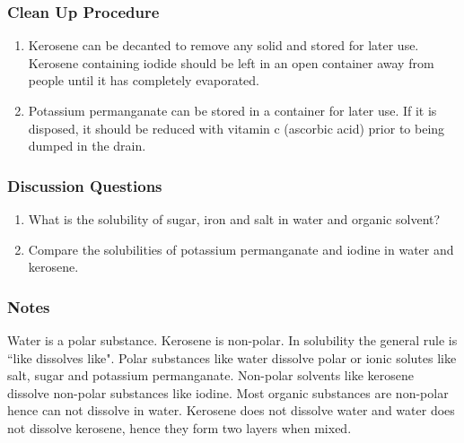 \subsubsection*{Clean Up Procedure}
\begin{enumerate}
\item{Kerosene can be decanted to remove any solid and stored for later use. Kerosene containing iodide should be left in an open container away from people until it has completely evaporated.}
\item{Potassium permanganate can be stored in a container for later use. If it is disposed, it should be reduced with vitamin c (ascorbic acid) prior to being dumped in the drain.}
\end{enumerate}

\subsubsection*{Discussion Questions}
\begin{enumerate}
\item{What is the solubility of sugar, iron and salt in water and organic solvent?}
\item{Compare the solubilities of potassium permanganate and iodine in water and kerosene.}
\end{enumerate}

\subsubsection*{Notes}
Water is a polar substance. Kerosene is non-polar. In solubility the general rule is ``like dissolves like". Polar substances like water dissolve polar or ionic solutes like salt, sugar and potassium permanganate. Non-polar solvents like kerosene dissolve non-polar substances like iodine. Most organic substances are non-polar hence can not dissolve in water. Kerosene does not dissolve water and water does not dissolve kerosene, hence they form two layers when mixed.
